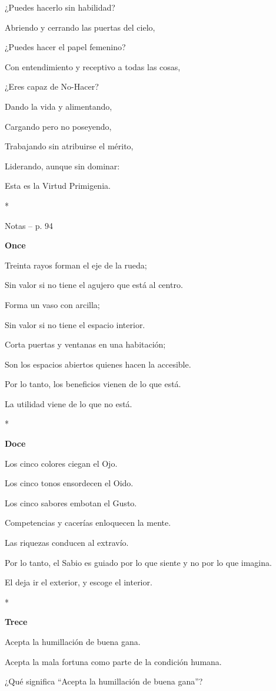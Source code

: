 ¿Puedes hacerlo sin habilidad?

Abriendo y cerrando las puertas del cielo,

¿Puedes hacer el papel femenino?

Con entendimiento y receptivo a todas las cosas,

¿Eres capaz de No-Hacer?

Dando la vida y alimentando,

Cargando pero no poseyendo,

Trabajando sin atribuirse el mérito,

Liderando, aunque sin dominar:

Esta es la Virtud Primigenia.

*

Notas -- p. 94

\textbf{Once}

Treinta rayos forman el eje de la rueda;

Sin valor si no tiene el agujero que está al centro.

Forma un vaso con arcilla;

Sin valor si no tiene el espacio interior.

Corta puertas y ventanas en una habitación;

Son los espacios abiertos quienes hacen la accesible.

Por lo tanto, los beneficios vienen de lo que está.

La utilidad viene de lo que no está.

*

\textbf{Doce}

Los cinco colores ciegan el Ojo.

Los cinco tonos ensordecen el Oido.

Los cinco sabores embotan el Gusto.

Competencias y cacerías enloquecen la mente.

Las riquezas conducen al extravío.

Por lo tanto, el Sabio es guiado por lo que siente y no por lo que
imagina.

El deja ir el exterior, y escoge el interior.

*

\textbf{Trece}

Acepta la humillación de buena gana.

Acepta la mala fortuna como parte de la condición humana.

¿Qué significa ``Acepta la humillación de buena gana''?

